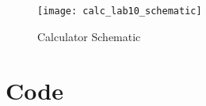 \documentclass[11pt]{article}
\newcommand{\Verilog}[2][]{%
	
}
\begin{document}
\begin{figure}[ht]\centering
	\texttt{[image: calc\_lab10\_schematic]}
	\caption{Calculator Schematic}
	\label{fig:calc_schematic}			
\end{figure}
\clearpage

	
\section*{Code}

\Verilog[caption=Counter Module,label=code:counter]{counter.sv}

\Verilog[caption=Counter Test Bench,label=code:counter_test]{counter_test.sv}

\Verilog[caption=7-seg Driver Module,label=code:sseg4_TDM]{sseg4_TDM.sv}

\Verilog[caption=7-seg Driver Test Bench,label=code:sseg4_TDM_test]{sseg4_TDM_test.sv}

\Verilog[caption=Calculator Module,label=code:calc_module]{calc_lab10.sv}
\end{document}
